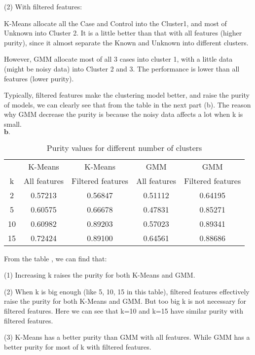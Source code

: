 \documentclass[12pt]{article}
\begin{document}
(2) With filtered features:

K-Means allocate all the Case and Control into the Cluster1, and most of Unknown into Cluster 2. It is a little better than that with all features (higher purity), since it almost separate the Known and Unknown into different clusters.

However, GMM allocate most of all 3 cases into cluster 1, with a little data (might be noisy data) into Cluster 2 and 3. The performance is lower than all features (lower purity).

Typically, filtered features make the clustering model better, and raise the purity of models, we can clearly see that from the table in the next part (b). The reason why GMM decrease the purity is because the noisy data affects a lot when k is small.\\


$\mathbf{b.}$

\begin{table}[th]
\centering
\begin{tabular}{@{}c|c|c|c|c}
\hline
 & K-Means & K-Means & GMM & GMM \\
k & All features & Filtered features & All features & Filtered features   \\ \hline
  2 & 0.57213  & 0.56847  & 0.51112 & 0.64195\\
  5 &  0.60575 & 0.66678  &  0.47831 & 0.85271\\
10 & 0.60982  &  0.89203 & 0.57023 & 0.89341 \\
15 & 0.72424  &  0.89100 & 0.64561 & 0.88686\\ \hline
\end{tabular}
\caption{Purity values for different number of clusters}
\end{table} 

From the table , we can find that:

(1) Increasing k raises the purity for both K-Means and GMM.

(2) When k is big enough (like 5, 10, 15 in this table), filtered features effectively raise the purity for both K-Means and GMM. But too big k is not necessary for filtered features. Here we can see that k=10 and k=15 have similar purity with filtered features.

(3) K-Means has a better purity than GMM with all features. While GMM has a better purity for most of k with filtered features.
\end{document}
